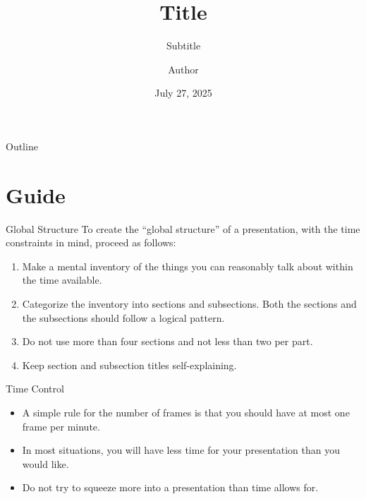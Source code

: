 \documentclass[compress,aspectratio=169]{beamer}
\title{Title}
\subtitle{Subtitle}
\author{Author}
\date{July 27, 2025}
\institute{School of XXXX\\[2mm]
  Joint work with Alice and Bob}
\begin{document}
\begin{frame}[plain]
    \titlepage
\end{frame}

\begin{frame}{Outline}
    \tableofcontents
\end{frame}

\section{Guide}

\begin{frame}{Global Structure}
    To create the ``global structure'' of a presentation, with the time constraints in mind, proceed as follows:

    \medskip
    \begin{enumerate}
        \item Make a mental inventory of the things you can reasonably talk about within the time available.

        \item Categorize the inventory into sections and subsections. Both the sections and the subsections should follow a logical pattern.

        \item Do not use more than four sections and not less than two per part.

        \item Keep section and subsection titles self-explaining.
    \end{enumerate}

\end{frame}

\begin{frame}{Time Control}
    \begin{itemize}\setlength{\itemsep}{1em}
        \item A simple rule for the number of frames is that you should have at most one frame per minute.

        \item In most situations, you will have less time for your presentation than you would like.

        \item Do not try to squeeze more into a presentation than time allows for.
    \end{itemize}
\end{frame}
\end{document}
